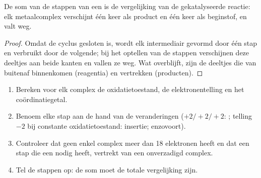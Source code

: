 \begin{proposition}\label{prop:b2:catalytic-cycles:cycle-sum}
De som van de stappen van een  is de vergelijking van de gekatalyseerde reactie:
elk metaalcomplex verschijnt één keer als product en één keer als beginstof, en valt weg.
\end{proposition}

\begin{proof}
Omdat de cyclus gesloten is, wordt elk intermediair gevormd door één stap en verbruikt door de volgende;
bij het optellen van de stappen verschijnen deze deeltjes aan beide kanten en vallen ze weg. Wat overblijft, zijn de
deeltjes die van buitenaf binnenkomen (reagentia) en vertrekken (producten).
\end{proof}

\begin{method}\label{met:b2:catalytic-cycles:read-cycle}
\begin{enumerate}
  \item Bereken voor elk complex de oxidatietoestand, de elektronentelling en het
        coördinatiegetal.
  \item Benoem elke stap aan de hand van de veranderingen ($+2/+2/+2$: ; telling $-2$ bij
        constante oxidatietoestand: insertie; enzovoort).
  \item Controleer dat geen enkel complex meer dan 18 elektronen heeft en dat een stap die een  nodig heeft, vertrekt van een onverzadigd complex.
  \item Tel de stappen op: de som moet de totale vergelijking zijn.
\end{enumerate}
\end{method}

